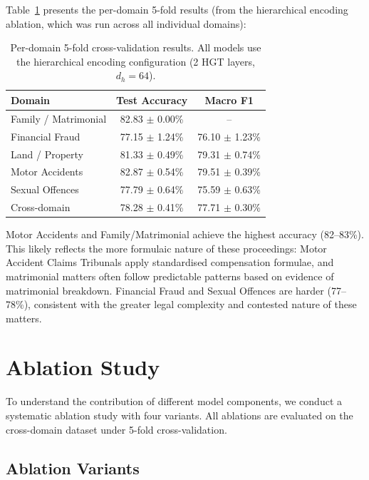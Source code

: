 \documentclass[12pt,a4paper]{report}
\begin{document}
Table~\ref{tab:per_domain_results} presents the per-domain 5-fold results (from the hierarchical encoding ablation, which was run across all individual domains):

\begin{table}[H]
  \centering
  \caption{Per-domain 5-fold cross-validation results. All models use the hierarchical encoding configuration (2 HGT layers, $d_h=64$).}
  \label{tab:per_domain_results}
  \begin{tabular}{lcc}
    \toprule
    \textbf{Domain} & \textbf{Test Accuracy} & \textbf{Macro F1} \\
    \midrule
    Family / Matrimonial & 82.83 $\pm$ 0.00\% & -- \\
    Financial Fraud & 77.15 $\pm$ 1.24\% & 76.10 $\pm$ 1.23\% \\
    Land / Property & 81.33 $\pm$ 0.49\% & 79.31 $\pm$ 0.74\% \\
    Motor Accidents & 82.87 $\pm$ 0.54\% & 79.51 $\pm$ 0.39\% \\
    Sexual Offences & 77.79 $\pm$ 0.64\% & 75.59 $\pm$ 0.63\% \\
    Cross-domain & 78.28 $\pm$ 0.41\% & 77.71 $\pm$ 0.30\% \\
    \bottomrule
  \end{tabular}
\end{table}

Motor Accidents and Family/Matrimonial achieve the highest accuracy (82--83\%). This likely reflects the more formulaic nature of these proceedings: Motor Accident Claims Tribunals apply standardised compensation formulae, and matrimonial matters often follow predictable patterns based on evidence of matrimonial breakdown. Financial Fraud and Sexual Offences are harder (77--78\%), consistent with the greater legal complexity and contested nature of these matters.

\section{Ablation Study}
\label{sec:ablation}

To understand the contribution of different model components, we conduct a systematic ablation study with four variants. All ablations are evaluated on the cross-domain dataset under 5-fold cross-validation.

\subsection{Ablation Variants}
\end{document}
